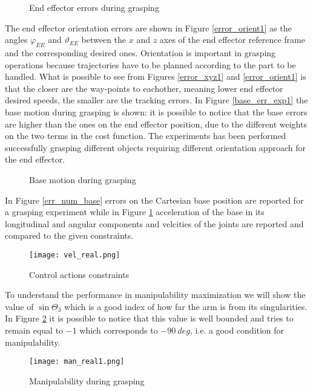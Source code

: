\begin{figure}[h!]
\centering
{}
\qquad
{}
\caption{End effector errors during grasping}
\end{figure}
The end effector orientation errors are shown in Figure \ref{error_orient1} as the angles $\varphi_{EE}$ and $\vartheta_{EE}$ between the $x$ and $z$ axes of the end effector reference frame and the corresponding desired ones. Orientation is important in grasping operations because trajectories have to be planned according to the part to be handled. What is possible to see from Figures \ref{error_xyz1} and \ref{error_orient1} is that the closer are the way-points to eachother, meaning lower end effector desired speeds, the smaller are the tracking errors. In Figure \ref{base_err_exp1} the base motion during grasping is shown: it is possible to notice that the base errors are higher than the ones on the end effector position, due to the different weights on the two terms in the cost function.
The experiments has been performed successfully grasping different objects requiring different orientation approach for the end effector.  

\begin{figure}%
\centering
{}%
\qquad
{}%
\caption{Base motion during grasping}
\end{figure}

In Figure \ref{err_num_base} errors on the Cartesian base position are reported for a grasping experiment while in Figure \ref{vel_real} acceleration of the base in its longitudinal and angular components and velcities of the joints are reported and compared to the given constraints.

\begin{figure}[h!]
\centering
\texttt{[image: vel\_real.png]}
\caption{Control actions constraints}
\label{vel_real}
\end{figure}
To understand the performance in manipulability maximization we will show the value of $\sin\Theta_3$ which is a good index of how far the arm is from its singularities. In Figure \ref{man_real1} it is possible to notice that this value is well bounded and tries to remain equal to $-1$ which corresponds to $-90\ deg$, i.e. a good condition for manipulability.
\begin{figure}[h!]
\centering
\texttt{[image: man\_real1.png]}
\caption{Manipulability during grasping}
\label{man_real1}
\end{figure}
